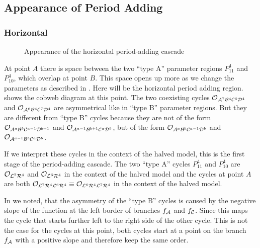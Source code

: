\subsection{Appearance of Period Adding}


\subsubsection{Horizontal}

\begin{figure}
    \centering
    \caption{Appearance of the horizontal period-adding cascade}
\end{figure}

At point $A$ there is space between the two ``type A'' parameter regions $P_{11}^{4}$ and $P_{10}^{4}$, which overlap at point $B$.
This space opens up more as we change the parameters as described in .
Here will be the horizontal period adding region.
 shows the cobweb diagram at this point.
The two coexisting cycles $\mathcal{O}_{\mathcal{A}^7\mathcal{B}^4\mathcal{C}^6\mathcal{D}^4}$ and $\mathcal{O}_{\mathcal{A}^6\mathcal{B}^4\mathcal{C}^7\mathcal{D}^4}$ are asymmetrical like in ``type B'' parameter regions.
But they are different from ``type B'' cycles because they are not of the form $\mathcal{O}_{\mathcal{A}^a\mathcal{B}^b\mathcal{C}^{a-1}\mathcal{D}^{b+1}}$ and $\mathcal{O}_{\mathcal{A}^{a-1}\mathcal{B}^{b+1}\mathcal{C}^a\mathcal{D}^b}$, but of the form $\mathcal{O}_{\mathcal{A}^a\mathcal{B}^b\mathcal{C}^{a-1}\mathcal{D}^b}$ and $\mathcal{O}_{\mathcal{A}^{a-1}\mathcal{B}^b\mathcal{C}^a\mathcal{D}^b}$.

If we interpret these cycles in the context of the halved model, this is the first stage of the period-adding cascade.
The two ``type A'' cycles $P_{11}^4$ and $P_{10}^4$ are $\mathcal{O}_{\mathcal{L}^7\mathcal{R}^4}$ and $\mathcal{O}_{\mathcal{L}^6\mathcal{R}^4}$ in the context of the halved model and the cycles at point $A$ are both $\mathcal{O}_{\mathcal{L}^7\mathcal{R}^4\mathcal{L}^6\mathcal{R}^4} \equiv \mathcal{O}_{\mathcal{L}^6\mathcal{R}^4\mathcal{L}^7\mathcal{R}^4}$ in the context of the halved model.

In  we noted, that the asymmetry of the ``type B'' cycles is caused by the negative slope of the function at the left border of branches $f_{\mathcal{A}}$ and $f_{\mathcal{C}}$.
Since this maps the cycle that starts further left to the right side of the other cycle.
This is not the case for the cycles at this point, both cycles start at a point on the branch $f_{\mathcal{A}}$ with a positive slope and therefore keep the same order.

